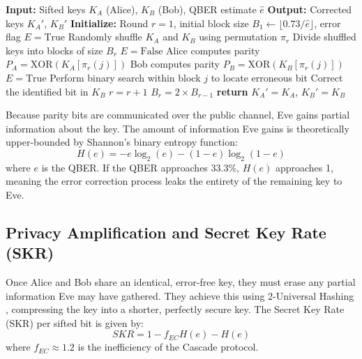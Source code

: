 \documentclass[conference]{IEEEtran}
\begin{document}
\begin{algorithm}[htbp]
\caption{Cascade Information Reconciliation Protocol}
\label{alg:cascade}
\begin{algorithmic}[1]
\State \textbf{Input:} Sifted keys $K_A$ (Alice), $K_B$ (Bob), QBER estimate $\hat{e}$
\State \textbf{Output:} Corrected keys $K_A'$, $K_B'$
\State \textbf{Initialize:} Round $r = 1$, initial block size $B_1 \leftarrow \lfloor 0.73 / \hat{e} \rfloor$, error flag $E = \text{True}$
    \State Randomly shuffle $K_A$ and $K_B$ using permutation $\pi_r$
    \State Divide shuffled keys into blocks of size $B_r$
    \State $E = \text{False}$
        \State Alice computes parity $P_A = \text{XOR}(K_A[\pi_r(j)])$
        \State Bob computes parity $P_B = \text{XOR}(K_B[\pi_r(j)])$
            \State $E = \text{True}$
            \State Perform binary search within block $j$ to locate erroneous bit
            \State Correct the identified bit in $K_B$
        \EndIf
    \EndFor
    \State $r = r + 1$
    \State $B_r = 2 \times B_{r-1}$ 
\EndWhile
\State \textbf{return} $K_A' = K_A$, $K_B' = K_B$
\end{algorithmic}
\end{algorithm}


Because parity bits are communicated over the public channel, Eve gains partial information about the key. The amount of information Eve gains is theoretically upper-bounded by Shannon's binary entropy function:
\begin{equation}
H(e) = -e \log_2(e) - (1-e) \log_2(1-e)
\end{equation}
where $e$ is the QBER. If the QBER approaches 33.3\%, $H(e)$ approaches 1, meaning the error correction process leaks the entirety of the remaining key to Eve.

\subsection{Privacy Amplification and Secret Key Rate (SKR)}
Once Alice and Bob share an identical, error-free key, they must erase any partial information Eve may have gathered. They achieve this using 2-Universal Hashing \cite{ben1997random}, compressing the key into a shorter, perfectly secure key. The Secret Key Rate (SKR) per sifted bit is given by:
\begin{equation}
SKR = 1 - f_{EC} H(e) - H(e)
\end{equation}
where $f_{EC} \approx 1.2$ is the inefficiency of the Cascade protocol.
\end{document}
